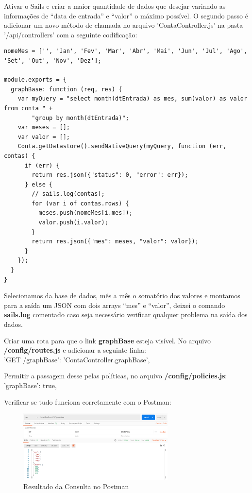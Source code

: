 \documentclass[a4paper,11pt]{article}
\begin{document}
Ativar o Sails e criar a maior quantidade de dados que desejar variando as informações de ``data de entrada'' e ``valor'' o máximo possível. O segundo passo é adicionar um novo método de chamada no arquivo 'ContaController.js' na pasta '/api/controllers' com a seguinte codificação:
\begin{lstlisting}
nomeMes = ['', 'Jan', 'Fev', 'Mar', 'Abr', 'Mai', 'Jun', 'Jul', 'Ago', 'Set', 'Out', 'Nov', 'Dez'];

module.exports = {
  graphBase: function (req, res) {
    var myQuery = "select month(dtEntrada) as mes, sum(valor) as valor from conta " +
        "group by month(dtEntrada)";
    var meses = [];
    var valor = [];
    Conta.getDatastore().sendNativeQuery(myQuery, function (err, contas) {
      if (err) {
        return res.json({"status": 0, "error": err});
      } else {
        // sails.log(contas);
        for (var i of contas.rows) {
          meses.push(nomeMes[i.mes]);
          valor.push(i.valor);
        }
        return res.json({"mes": meses, "valor": valor});
      }
    });
  }
}
\end{lstlisting}

Selecionamos da base de dados, mês a mês o somatório dos valores e montamos para a saída um JSON com dois arrays ``mes'' e ``valor'', deixei o comando \textbf{sails.log} comentado caso seja necessário verificar qualquer problema na saída dos dados.

Criar uma rota para que o link \textbf{graphBase} esteja visível. No arquivo \textbf{/config/routes.js} e adicionar a seguinte linha: \\
{\ttfamily 'GET /graphBase': 'ContaController.graphBase',}

Permitir a passagem desse pelas políticas, no arquivo \textbf{/config/policies.js}: \\
{\ttfamily 'graphBase': true,}

Verificar se tudo funciona corretamente com o Postman:
\begin{figure}[H]
	\centering
	\includegraphics[width=0.7\textwidth]{imagens/postmanFinal.png}
	\caption{Resultado da Consulta no Postman}
\end{figure}
\end{document}
